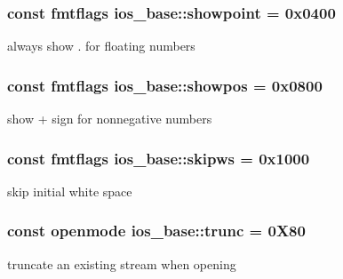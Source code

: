 \subsubsection[{\texorpdfstring{showpoint}{showpoint}}]{\setlength{\rightskip}{0pt plus 5cm}const {\bf fmtflags} ios\+\_\+base\+::showpoint = 0x0400\hspace{0.3cm}{\ttfamily [static]}}\hypertarget{classios__base_ac9bb172682e157f037bd7fb82a236ee6}{}\label{classios__base_ac9bb172682e157f037bd7fb82a236ee6}
always show \textquotesingle{}.\textquotesingle{} for floating numbers 
\subsubsection[{\texorpdfstring{showpos}{showpos}}]{\setlength{\rightskip}{0pt plus 5cm}const {\bf fmtflags} ios\+\_\+base\+::showpos = 0x0800\hspace{0.3cm}{\ttfamily [static]}}\hypertarget{classios__base_a7bfa4a883933105d10f8ce2693cb9f21}{}\label{classios__base_a7bfa4a883933105d10f8ce2693cb9f21}
show + sign for nonnegative numbers 
\subsubsection[{\texorpdfstring{skipws}{skipws}}]{\setlength{\rightskip}{0pt plus 5cm}const {\bf fmtflags} ios\+\_\+base\+::skipws = 0x1000\hspace{0.3cm}{\ttfamily [static]}}\hypertarget{classios__base_a64977c777d6e45826d1be9763f17f824}{}\label{classios__base_a64977c777d6e45826d1be9763f17f824}
skip initial white space 
\subsubsection[{\texorpdfstring{trunc}{trunc}}]{\setlength{\rightskip}{0pt plus 5cm}const {\bf openmode} ios\+\_\+base\+::trunc = 0\+X80\hspace{0.3cm}{\ttfamily [static]}}\hypertarget{classios__base_ae62b8972f37509819e1384214071194b}{}\label{classios__base_ae62b8972f37509819e1384214071194b}
truncate an existing stream when opening 
